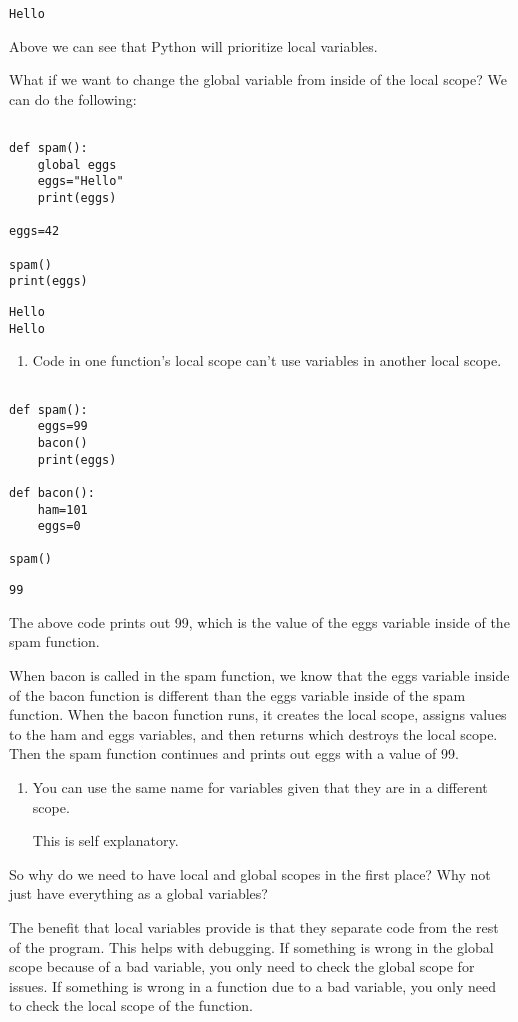 \documentclass[11pt]{article}
\begin{document}
\begin{verbatim}
Hello
\end{verbatim}


Above we can see that Python will prioritize local variables.

What if we want to change the global variable from inside of the local scope? We can do the following:

\begin{verbatim}

def spam():
    global eggs
    eggs="Hello"
    print(eggs)

eggs=42

spam()
print(eggs)

\end{verbatim}

\begin{verbatim}
Hello
Hello
\end{verbatim}


\begin{enumerate}
\item Code in one function's local scope can't use variables in another local scope.
\end{enumerate}

\begin{verbatim}

def spam():
    eggs=99
    bacon()
    print(eggs)

def bacon():
    ham=101
    eggs=0

spam()

\end{verbatim}

\begin{verbatim}
99
\end{verbatim}


The above code prints out 99, which is the value of the eggs variable inside of the spam function.

When bacon is called in the spam function, we know that the eggs variable inside of the bacon function is different than the eggs variable inside of the spam function. When the bacon function runs, it creates the local scope, assigns values to the ham and eggs variables, and then returns which destroys the local scope. Then the spam function continues and prints out eggs with a value of 99.


\begin{enumerate}
\item You can use the same name for variables given that they are in a different scope.

This is self explanatory.
\end{enumerate}


So why do we need to have local and global scopes in the first place? Why not just have everything as a global variables?

The benefit that local variables provide is that they separate code from the rest of the program. This helps with debugging. If something is wrong in the global scope because of a bad variable, you only need to check the global scope for issues. If something is wrong in a function due to a bad variable, you only need to check the local scope of the function.
\end{document}
